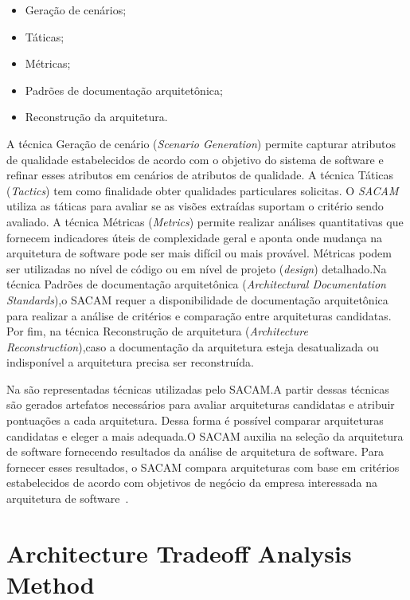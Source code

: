 \begin{itemize}
    \item Geração de cenários;
    \item Táticas;
    \item Métricas;
    \item Padrões de documentação arquitetônica;
    \item Reconstrução da arquitetura.
\end{itemize}

A técnica Geração de cenário (\emph{Scenario Generation}) permite capturar atributos de qualidade estabelecidos de acordo com o objetivo do sistema de software  e refinar esses atributos em cenários de atributos de qualidade. A técnica Táticas (\emph{Tactics}) tem como finalidade  obter qualidades particulares solicitas.
O \emph{\acrfull{SACAM}} utiliza as táticas para avaliar se as visões extraídas suportam o critério sendo avaliado.
A técnica Métricas (\emph{Metrics}) permite realizar análises quantitativas que fornecem indicadores úteis de complexidade geral e aponta onde  mudança na arquitetura de software pode ser mais difícil ou mais provável. 
Métricas podem ser utilizadas no nível de código ou em  nível de projeto (\emph{design}) detalhado.Na técnica Padrões de documentação arquitetônica (\emph{Architectural Documentation Standards}),o SACAM requer a disponibilidade de documentação arquitetônica para realizar a análise de critérios e comparação entre arquiteturas candidatas. Por fim, na técnica Reconstrução de arquitetura (\emph{Architecture Reconstruction}),caso a documentação da arquitetura esteja desatualizada ou indisponível a arquitetura precisa ser reconstruída. 

%

Na  são representadas técnicas utilizadas pelo SACAM.A partir dessas técnicas são gerados artefatos necessários para avaliar arquiteturas candidatas e atribuir pontuações a cada arquitetura. Dessa forma é possível comparar arquiteturas candidatas e eleger a mais adequada.O SACAM auxilia na seleção da arquitetura de software fornecendo resultados da análise de arquitetura de software. Para fornecer esses resultados, o SACAM compara arquiteturas com base em critérios estabelecidos de acordo com objetivos de negócio da empresa interessada na arquitetura de software~\cite{SACAM}. 

\section{Architecture Tradeoff Analysis Method}

